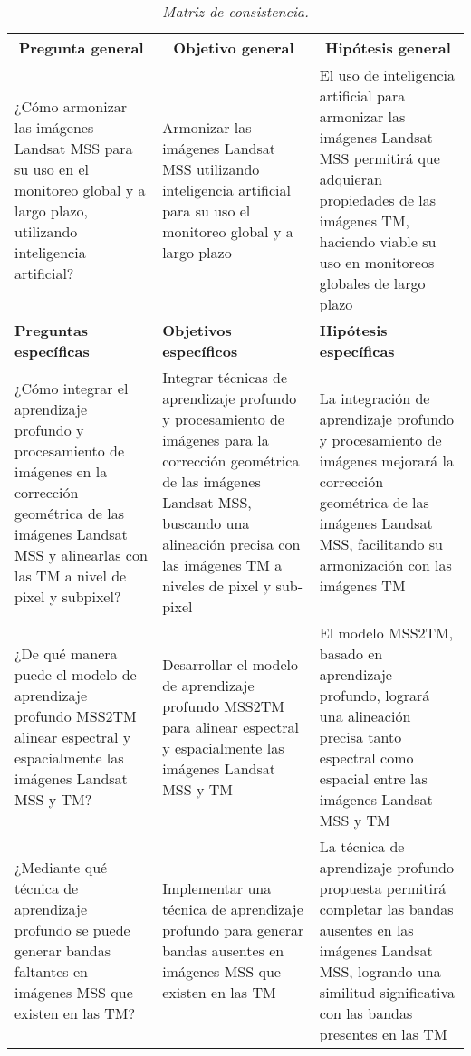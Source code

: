 \begin{table}[H]
    \caption{\doublespacing \\ \textit{Matriz de consistencia.}}
    \centering
    \begin{spacing}{8}
        \fontsize{8pt}{2pt}\selectfont
        \begin{tabularx}{\textwidth}{@{}XXX@{}}
            \toprule
            \multicolumn{1}{c}{\textbf{Pregunta general}} & \multicolumn{1}{c}{\textbf{Objetivo general}} & \multicolumn{1}{c}{\textbf{Hipótesis general}} \\
            \midrule
            ¿Cómo armonizar las imágenes Landsat MSS para su uso en el monitoreo global y a largo plazo, utilizando inteligencia artificial? & Armonizar las imágenes Landsat MSS utilizando inteligencia artificial para su uso el monitoreo global y a largo plazo & El uso de inteligencia artificial para armonizar las imágenes Landsat MSS permitirá que adquieran propiedades de las imágenes TM, haciendo viable su uso en monitoreos globales de largo plazo \\
            \addlinespace
            \midrule
            \textbf{Preguntas específicas} & \textbf{Objetivos específicos} & \textbf{Hipótesis específicas} \\
            \midrule
            ¿Cómo integrar el aprendizaje profundo y procesamiento de imágenes en la corrección geométrica de las imágenes Landsat MSS y alinearlas con las TM a nivel de pixel y subpixel? & Integrar técnicas de aprendizaje profundo y procesamiento de imágenes para la corrección geométrica de las imágenes Landsat MSS, buscando una alineación precisa con las imágenes TM a niveles de pixel y sub-pixel & La integración de aprendizaje profundo y procesamiento de imágenes mejorará la corrección geométrica de las imágenes Landsat MSS, facilitando su armonización con las imágenes TM \\
            \addlinespace
            ¿De qué manera puede el modelo de aprendizaje profundo MSS2TM alinear espectral y espacialmente las imágenes Landsat MSS y TM? & Desarrollar el modelo de aprendizaje profundo MSS2TM para alinear espectral y espacialmente las imágenes Landsat MSS y TM & El modelo MSS2TM, basado en aprendizaje profundo, logrará una alineación precisa tanto espectral como espacial entre las imágenes Landsat MSS y TM \\
            \addlinespace
            ¿Mediante qué técnica de aprendizaje profundo se puede generar bandas faltantes en imágenes MSS que existen en las TM? & Implementar una técnica de aprendizaje profundo para generar bandas ausentes en imágenes MSS que existen en las TM & La técnica de aprendizaje profundo propuesta permitirá completar las bandas ausentes en las imágenes Landsat MSS, logrando una similitud significativa con las bandas presentes en las TM \\
            \bottomrule
        \end{tabularx}
    \end{spacing}
    \label{MatrizConsistencia}
\end{table}




